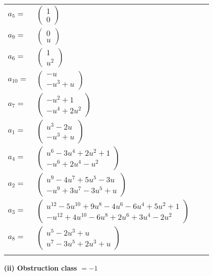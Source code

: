 \documentclass[1p]{elsarticle_modified}
\theoremstyle{definition}
\begin{document}
\begin{tabular}{m{7pt} m{180pt} m{7pt} m{180pt} }
\flushright $a_{5}=$&$\begin{pmatrix}1\\0\end{pmatrix}$ \\
\flushright $a_{9}=$&$\begin{pmatrix}0\\u\end{pmatrix}$ \\
\flushright $a_{6}=$&$\begin{pmatrix}1\\u^2\end{pmatrix}$ \\
\flushright $a_{10}=$&$\begin{pmatrix}- u\\- u^3+u\end{pmatrix}$ \\
\flushright $a_{7}=$&$\begin{pmatrix}- u^2+1\\- u^4+2 u^2\end{pmatrix}$ \\
\flushright $a_{1}=$&$\begin{pmatrix}u^3-2 u\\- u^3+u\end{pmatrix}$ \\
\flushright $a_{4}=$&$\begin{pmatrix}u^6-3 u^4+2 u^2+1\\- u^6+2 u^4- u^2\end{pmatrix}$ \\
\flushright $a_{2}=$&$\begin{pmatrix}u^9-4 u^7+5 u^5-3 u\\- u^9+3 u^7-3 u^5+u\end{pmatrix}$ \\
\flushright $a_{3}=$&$\begin{pmatrix}u^{12}-5 u^{10}+9 u^8-4 u^6-6 u^4+5 u^2+1\\- u^{12}+4 u^{10}-6 u^8+2 u^6+3 u^4-2 u^2\end{pmatrix}$ \\
\flushright $a_{8}=$&$\begin{pmatrix}u^5-2 u^3+u\\u^7-3 u^5+2 u^3+u\end{pmatrix}$\\&\end{tabular}
\flushleft \textbf{(ii) Obstruction class $= -1$}\\~\\
\end{document}
